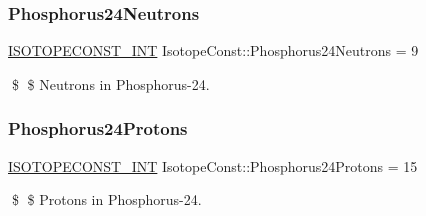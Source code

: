 \subsubsection{\texorpdfstring{Phosphorus24\+Neutrons}{Phosphorus24Neutrons}}
{\footnotesize\ttfamily \mbox{\hyperlink{group___isotope_const-_macros_ga5f18360b3e99483a35c32d789e62621c}{I\+S\+O\+T\+O\+P\+E\+C\+O\+N\+S\+T\+\_\+\+I\+NT}} Isotope\+Const\+::\+Phosphorus24\+Neutrons = 9}

\$ \$ Neutrons in Phosphorus-\/24. \mbox{\label{group___isotope_const-_phosphorus-_p24_gaea95e3416e0c5fb7c9b1c971565ddc11}} 
\subsubsection{\texorpdfstring{Phosphorus24\+Protons}{Phosphorus24Protons}}
{\footnotesize\ttfamily \mbox{\hyperlink{group___isotope_const-_macros_ga5f18360b3e99483a35c32d789e62621c}{I\+S\+O\+T\+O\+P\+E\+C\+O\+N\+S\+T\+\_\+\+I\+NT}} Isotope\+Const\+::\+Phosphorus24\+Protons = 15}

\$ \$ Protons in Phosphorus-\/24. 